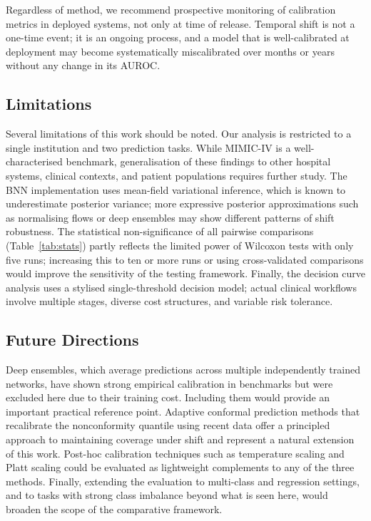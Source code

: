 \documentclass[11pt,a4paper]{article}
\begin{document}
Regardless of method, we recommend prospective monitoring of calibration metrics in deployed systems, not only at time of release. Temporal shift is not a one-time event; it is an ongoing process, and a model that is well-calibrated at deployment may become systematically miscalibrated over months or years without any change in its AUROC.

\subsection{Limitations}

Several limitations of this work should be noted. Our analysis is restricted to a single institution and two prediction tasks. While MIMIC-IV is a well-characterised benchmark, generalisation of these findings to other hospital systems, clinical contexts, and patient populations requires further study. The BNN implementation uses mean-field variational inference, which is known to underestimate posterior variance; more expressive posterior approximations such as normalising flows or deep ensembles \citep{lakshminarayanan2017} may show different patterns of shift robustness. The statistical non-significance of all pairwise comparisons (Table~\ref{tab:stats}) partly reflects the limited power of Wilcoxon tests with only five runs; increasing this to ten or more runs or using cross-validated comparisons would improve the sensitivity of the testing framework. Finally, the decision curve analysis uses a stylised single-threshold decision model; actual clinical workflows involve multiple stages, diverse cost structures, and variable risk tolerance.

\subsection{Future Directions}

Deep ensembles, which average predictions across multiple independently trained networks, have shown strong empirical calibration in benchmarks but were excluded here due to their training cost. Including them would provide an important practical reference point. Adaptive conformal prediction methods \citep{tibshirani2019} that recalibrate the nonconformity quantile using recent data offer a principled approach to maintaining coverage under shift and represent a natural extension of this work. Post-hoc calibration techniques such as temperature scaling and Platt scaling could be evaluated as lightweight complements to any of the three methods. Finally, extending the evaluation to multi-class and regression settings, and to tasks with strong class imbalance beyond what is seen here, would broaden the scope of the comparative framework.
\end{document}
